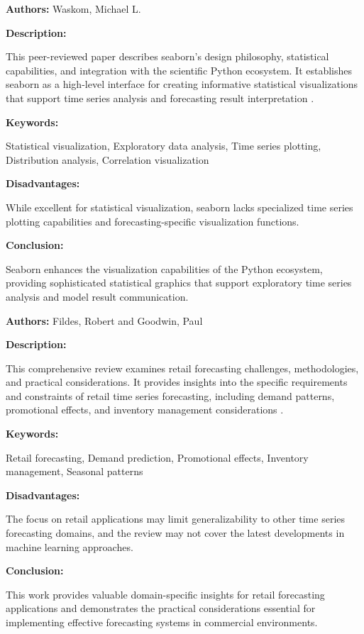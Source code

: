 
{ 
	
	\textbf{Authors:} Waskom, Michael L.
	
	\textbf{Description:}
	
	This peer-reviewed paper describes seaborn's design philosophy, statistical capabilities, and integration with the scientific Python ecosystem. It establishes seaborn as a high-level interface for creating informative statistical visualizations that support time series analysis and forecasting result interpretation \autocite{Waskom:2021}.
	
	\textbf{Keywords:}
	
	Statistical visualization, Exploratory data analysis, Time series plotting, Distribution analysis, Correlation visualization
	
	\textbf{Disadvantages:}
	
	While excellent for statistical visualization, seaborn lacks specialized time series plotting capabilities and forecasting-specific visualization functions.
	
	\textbf{Conclusion:}
	
	Seaborn enhances the visualization capabilities of the Python ecosystem, providing sophisticated statistical graphics that support exploratory time series analysis and model result communication.
	
}


{ 
	
	\textbf{Authors:} Fildes, Robert and Goodwin, Paul
	
	\textbf{Description:}
	
	This comprehensive review examines retail forecasting challenges, methodologies, and practical considerations. It provides insights into the specific requirements and constraints of retail time series forecasting, including demand patterns, promotional effects, and inventory management considerations \autocite{Fildes:2019}.
	
	\textbf{Keywords:}
	
	Retail forecasting, Demand prediction, Promotional effects, Inventory management, Seasonal patterns
	
	\textbf{Disadvantages:}
	
	The focus on retail applications may limit generalizability to other time series forecasting domains, and the review may not cover the latest developments in machine learning approaches.
	
	\textbf{Conclusion:}
	
	This work provides valuable domain-specific insights for retail forecasting applications and demonstrates the practical considerations essential for implementing effective forecasting systems in commercial environments.
	
}


